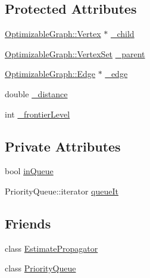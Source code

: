 \subsection*{Protected Attributes}
\begin{DoxyCompactItemize}
\item 
\mbox{\hyperlink{classg2o_1_1_optimizable_graph_1_1_vertex}{Optimizable\+Graph\+::\+Vertex}} $\ast$ \mbox{\hyperlink{classg2o_1_1_estimate_propagator_1_1_adjacency_map_entry_ab6f716e85cc15e6d9c570132fe889fd6}{\+\_\+child}}
\item 
\mbox{\hyperlink{classg2o_1_1_hyper_graph_a703938cdb4bb636860eed55a2489d70c}{Optimizable\+Graph\+::\+Vertex\+Set}} \mbox{\hyperlink{classg2o_1_1_estimate_propagator_1_1_adjacency_map_entry_a72384502361d60e1f3ae1644de1e7379}{\+\_\+parent}}
\item 
\mbox{\hyperlink{classg2o_1_1_optimizable_graph_1_1_edge}{Optimizable\+Graph\+::\+Edge}} $\ast$ \mbox{\hyperlink{classg2o_1_1_estimate_propagator_1_1_adjacency_map_entry_a738795d0b3989374ba51821354629d64}{\+\_\+edge}}
\item 
double \mbox{\hyperlink{classg2o_1_1_estimate_propagator_1_1_adjacency_map_entry_a3558503af9d9f56088ff1593398f86d4}{\+\_\+distance}}
\item 
int \mbox{\hyperlink{classg2o_1_1_estimate_propagator_1_1_adjacency_map_entry_a56bfab4074fa692f03378526007758f7}{\+\_\+frontier\+Level}}
\end{DoxyCompactItemize}
\subsection*{Private Attributes}
\begin{DoxyCompactItemize}
\item 
bool \mbox{\hyperlink{classg2o_1_1_estimate_propagator_1_1_adjacency_map_entry_a6697b7728a51b80663f843daba54e2d8}{in\+Queue}}
\item 
Priority\+Queue\+::iterator \mbox{\hyperlink{classg2o_1_1_estimate_propagator_1_1_adjacency_map_entry_a40828826b865378855fdc26fae46af11}{queue\+It}}
\end{DoxyCompactItemize}
\subsection*{Friends}
\begin{DoxyCompactItemize}
\item 
class \mbox{\hyperlink{classg2o_1_1_estimate_propagator_1_1_adjacency_map_entry_a84fd16bbb058a331370b1b9983896264}{Estimate\+Propagator}}
\item 
class \mbox{\hyperlink{classg2o_1_1_estimate_propagator_1_1_adjacency_map_entry_afde21c6f1b41de5a73362b2fcfec056b}{Priority\+Queue}}
\end{DoxyCompactItemize}


